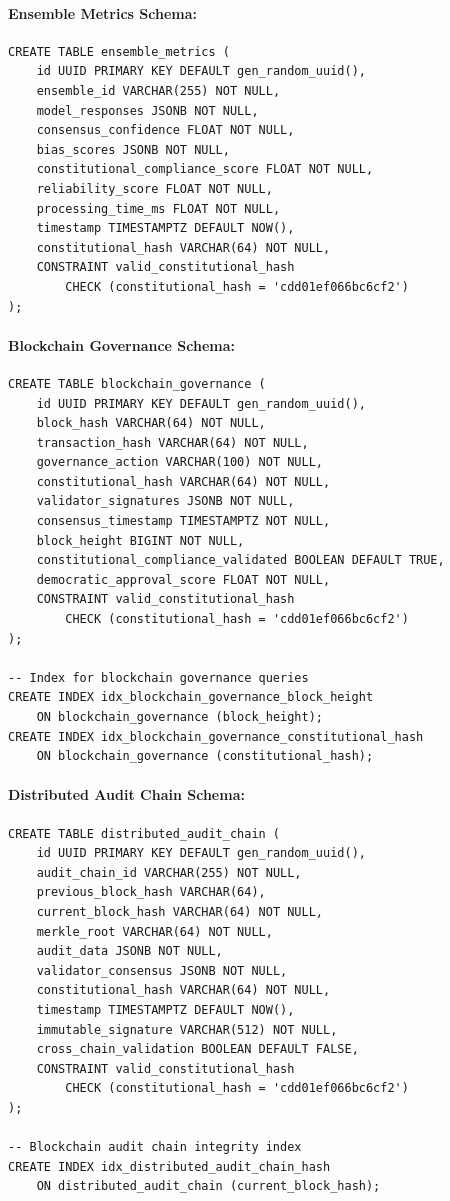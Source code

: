 \documentclass[manuscript,screen,9pt]{acmart}
\begin{document}
\paragraph{Ensemble Metrics Schema:}
\begin{verbatim}
CREATE TABLE ensemble_metrics (
    id UUID PRIMARY KEY DEFAULT gen_random_uuid(),
    ensemble_id VARCHAR(255) NOT NULL,
    model_responses JSONB NOT NULL,
    consensus_confidence FLOAT NOT NULL,
    bias_scores JSONB NOT NULL,
    constitutional_compliance_score FLOAT NOT NULL,
    reliability_score FLOAT NOT NULL,
    processing_time_ms FLOAT NOT NULL,
    timestamp TIMESTAMPTZ DEFAULT NOW(),
    constitutional_hash VARCHAR(64) NOT NULL,
    CONSTRAINT valid_constitutional_hash
        CHECK (constitutional_hash = 'cdd01ef066bc6cf2')
);
\end{verbatim}

\paragraph{Blockchain Governance Schema:}
\begin{verbatim}
CREATE TABLE blockchain_governance (
    id UUID PRIMARY KEY DEFAULT gen_random_uuid(),
    block_hash VARCHAR(64) NOT NULL,
    transaction_hash VARCHAR(64) NOT NULL,
    governance_action VARCHAR(100) NOT NULL,
    constitutional_hash VARCHAR(64) NOT NULL,
    validator_signatures JSONB NOT NULL,
    consensus_timestamp TIMESTAMPTZ NOT NULL,
    block_height BIGINT NOT NULL,
    constitutional_compliance_validated BOOLEAN DEFAULT TRUE,
    democratic_approval_score FLOAT NOT NULL,
    CONSTRAINT valid_constitutional_hash
        CHECK (constitutional_hash = 'cdd01ef066bc6cf2')
);

-- Index for blockchain governance queries
CREATE INDEX idx_blockchain_governance_block_height
    ON blockchain_governance (block_height);
CREATE INDEX idx_blockchain_governance_constitutional_hash
    ON blockchain_governance (constitutional_hash);
\end{verbatim}

\paragraph{Distributed Audit Chain Schema:}
\begin{verbatim}
CREATE TABLE distributed_audit_chain (
    id UUID PRIMARY KEY DEFAULT gen_random_uuid(),
    audit_chain_id VARCHAR(255) NOT NULL,
    previous_block_hash VARCHAR(64),
    current_block_hash VARCHAR(64) NOT NULL,
    merkle_root VARCHAR(64) NOT NULL,
    audit_data JSONB NOT NULL,
    validator_consensus JSONB NOT NULL,
    constitutional_hash VARCHAR(64) NOT NULL,
    timestamp TIMESTAMPTZ DEFAULT NOW(),
    immutable_signature VARCHAR(512) NOT NULL,
    cross_chain_validation BOOLEAN DEFAULT FALSE,
    CONSTRAINT valid_constitutional_hash
        CHECK (constitutional_hash = 'cdd01ef066bc6cf2')
);

-- Blockchain audit chain integrity index
CREATE INDEX idx_distributed_audit_chain_hash
    ON distributed_audit_chain (current_block_hash);
\end{verbatim}
\end{document}
